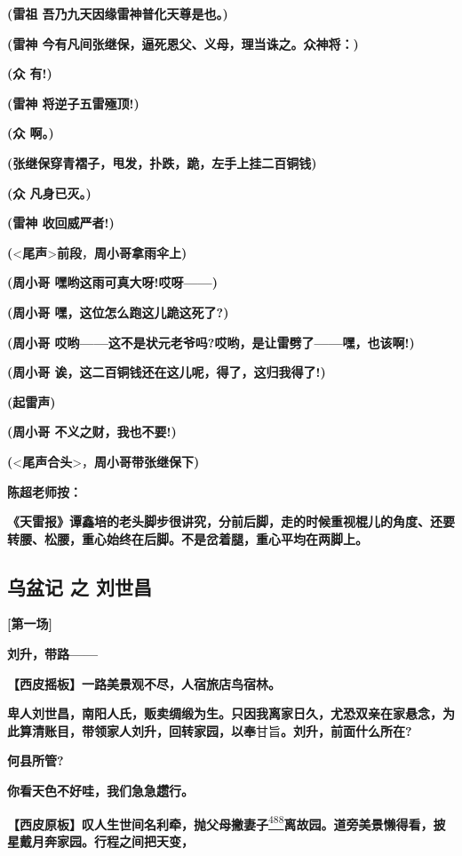 \textbf{(雷祖 吾乃九天因缘雷神普化天尊是也。)}

\textbf{(雷神 今有凡间张继保，逼死恩父、义母，理当诛之。众神将：)}

\textbf{(众 有!)}

\textbf{(雷神 将逆子五雷殛顶!)}

\textbf{(众 啊。)}

\textbf{(张继保穿青褶子，甩发，扑跌，跪，左手上挂二百铜钱)}

\textbf{(众 凡身已灭。)}

\textbf{(雷神 收回威严者!)}

\textbf{(}\textless{}\textbf{尾声}\textgreater{}\textbf{前段}，\textbf{周小哥拿雨伞上)}

\textbf{(周小哥 嘿哟这雨可真大呀!哎呀------)}

\textbf{(周小哥 嘿，这位怎么跑这儿跪这死了?)}

\textbf{(周小哥
哎哟------这不是状元老爷吗?哎哟，是让雷劈了------嘿，也该啊!)}

\textbf{(周小哥 诶，这二百铜钱还在这儿呢，得了，这归我得了!)}

\textbf{(起雷声)}

\textbf{(周小哥 不义之财，我也不要!)}

\textbf{(}\textless{}\textbf{尾声合头}\textgreater{}，\textbf{周小哥带张继保下)}

\textbf{陈超老师按：}

\textbf{《天雷报》谭鑫培的老头脚步很讲究，分前后脚，走的时候重视棍儿的角度、还要转腰、松腰，重心始终在后脚。不是岔着腿，重心平均在两脚上。}

\newpage
\hypertarget{ux4e4cux76c6ux8bb0-ux4e4b-ux5218ux4e16ux660c}{%
\subsection{乌盆记 之
刘世昌}\label{ux4e4cux76c6ux8bb0-ux4e4b-ux5218ux4e16ux660c}}

\textbf{{[}第一场{]}}

\textbf{刘升，带路------}

\textbf{【西皮摇板】一路美景观不尽，人宿旅店鸟宿林。}

\textbf{卑人刘世昌，南阳人氏，贩卖绸缎为生。只因我离家日久，尤恐双亲在家悬念，为此算清账目，带领家人刘升，回转家园，以奉}甘旨\textbf{。刘升，前面什么所在?}

\textbf{何县所管?}

\textbf{你看天色不好哇，我们急急趱行。}

\textbf{【西皮原板】叹人生世间名利牵，抛父母撇妻子}\protect\hyperlink{fn488}{\textsuperscript{488}}\textbf{离故园。道旁美景懒得看，披星戴月奔家园。行程之间把天变，}

